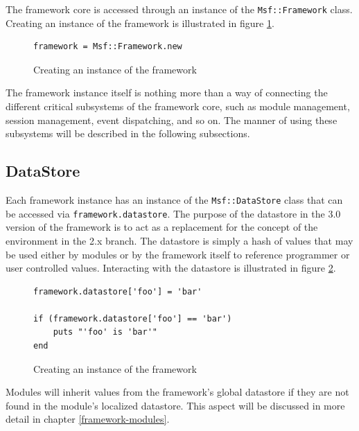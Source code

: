 \documentclass{report}
\begin{document}
\par
The framework core is accessed through an instance of the
\texttt{Msf::Framework} class.  Creating an instance of the
framework is illustrated in figure \ref{fig-code-framework-create}.

\begin{figure}[h]
\begin{verbatim}
framework = Msf::Framework.new
\end{verbatim}
\caption{Creating an instance of the framework}
\label{fig-code-framework-create}
\end{figure}

\par
The framework instance itself is nothing more than a way of
connecting the different critical subsystems of the framework core,
such as module management, session management, event dispatching,
and so on.  The manner of using these subsystems will be described
in the following subsections.

        \subsection{DataStore}

\par
Each framework instance has an instance of the
\texttt{Msf::DataStore} class that can be accessed via
\texttt{framework.datastore}.  The purpose of the datastore in the
3.0 version of the framework is to act as a replacement for the
concept of the environment in the 2.x branch.  The datastore is
simply a hash of values that may be used either by modules or by the
framework itself to reference programmer or user controlled values.
Interacting with the datastore is illustrated in figure
\ref{fig-code-framework-datastore}.

\begin{figure}[h]
\begin{verbatim}
framework.datastore['foo'] = 'bar'

if (framework.datastore['foo'] == 'bar')
    puts "'foo' is 'bar'"
end
\end{verbatim}
\caption{Creating an instance of the framework}
\label{fig-code-framework-datastore}
\end{figure}

\par
Modules will inherit values from the framework's global datastore if
they are not found in the module's localized datastore.  This aspect
will be discussed in more detail in chapter \ref{framework-modules}.
\end{document}
